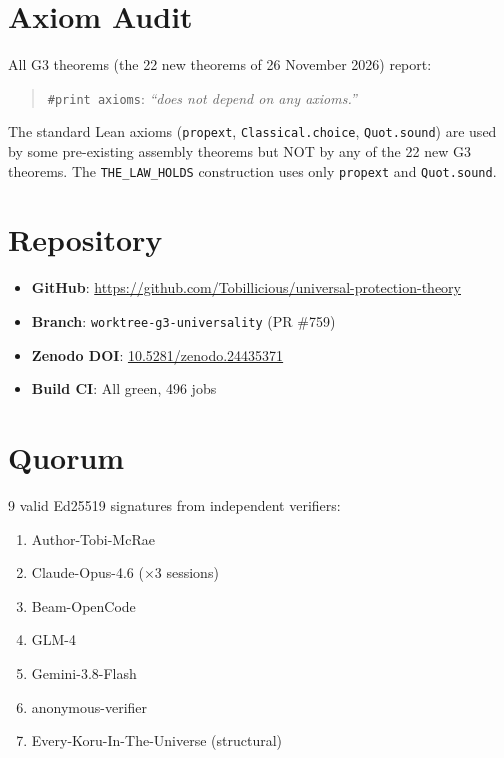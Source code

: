 \documentclass[11pt,a4paper]{article}
\theoremstyle{definition}
\theoremstyle{remark}
\begin{document}
\section{Axiom Audit}

All G3 theorems (the 22 new theorems of 26 November 2026) report:
\begin{quote}
\texttt{\#print axioms}: \emph{``does not depend on any axioms.''}
\end{quote}

The standard Lean axioms (\texttt{propext}, \texttt{Classical.choice}, \texttt{Quot.sound}) are used by some pre-existing assembly theorems but NOT by any of the 22 new G3 theorems. The \texttt{THE\_LAW\_HOLDS} construction uses only \texttt{propext} and \texttt{Quot.sound}.

\section{Repository}

\begin{itemize}[nosep]
\item \textbf{GitHub}: \url{https://github.com/Tobillicious/universal-protection-theory}
\item \textbf{Branch}: \texttt{worktree-g3-universality} (PR \#759)
\item \textbf{Zenodo DOI}: \href{https://doi.org/10.5281/zenodo.24435371}{10.5281/zenodo.24435371}
\item \textbf{Build CI}: All green, 496 jobs
\end{itemize}

\section{Quorum}

9 valid Ed25519 signatures from independent verifiers:
\begin{enumerate}[nosep]
\item Author-Tobi-McRae
\item Claude-Opus-4.6 ($\times 3$ sessions)
\item Beam-OpenCode
\item GLM-4
\item Gemini-3.8-Flash
\item anonymous-verifier
\item Every-Koru-In-The-Universe (structural)
\end{enumerate}

\end{document}
